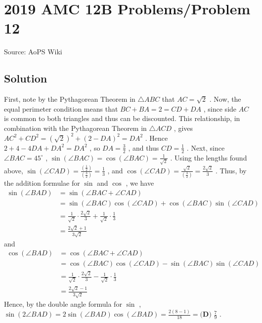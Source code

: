 \documentclass[12pt]{article}
\begin{document}
\section*{{2019 AMC 12B Problems/Problem 12}}
Source: AoPS Wiki

\subsection*{Solution}
First, note by the Pythagorean Theorem in $\triangle ABC$ that $AC = \sqrt{2}$ . Now, the equal perimeter condition means that $BC + BA = 2 = CD + DA$ , since side $AC$ is common to both triangles and thus can be discounted. This relationship, in combination with the Pythagorean Theorem in $\triangle ACD$ , gives $AC^2+CD^2=\left(\sqrt{2}\right)^2+\left(2-DA\right)^2=DA^2$ . Hence $2 + 4 - 4DA + DA^2 = DA^2$ , so $DA = \frac{3}{2}$ , and thus $CD = \frac{1}{2}$ . Next, since $\angle BAC = 45^{\circ}$ , $\sin{\left(\angle BAC\right)} = \cos{\left(\angle BAC\right)} = \frac{1}{\sqrt{2}}$ . Using the lengths found above, $\sin{\left(\angle CAD\right)} = \frac{\left(\frac{1}{2}\right)}{\left(\frac{3}{2}\right)} = \frac{1}{3}$ , and $\cos{\left(\angle CAD\right)} = \frac{\sqrt{2}}{\left(\frac{3}{2}\right)} = \frac{2 \sqrt{2}}{3}$ . Thus, by the addition formulae for $\sin$ and $\cos$ , we have \[\begin{split}\sin{\left(\angle BAD\right)}&=\sin{\left(\angle BAC + \angle CAD\right)}\\&=\sin{\left(\angle BAC\right)}\cos{\left(\angle CAD\right)}+\cos{\left(\angle BAC\right)}\sin{\left(\angle CAD\right)}\\&=\frac{1}{\sqrt{2}}\cdot\frac{2 \sqrt{2}}{3} + \frac{1}{\sqrt{2}}\cdot\frac{1}{3} \\ &= \frac{2 \sqrt{2} + 1}{3 \sqrt{2}}\end{split}\] and \[\begin{split}\cos{\left(\angle BAD\right)}&=\cos{\left(\angle BAC + \angle CAD\right)}\\&=\cos{\left(\angle BAC\right)}\cos{\left(\angle CAD\right)}-\sin{\left(\angle BAC\right)}\sin{\left(\angle CAD\right)}\\&=\frac{1}{\sqrt{2}}\cdot\frac{2 \sqrt{2}}{3} - \frac{1}{\sqrt{2}}\cdot\frac{1}{3} \\ &= \frac{2 \sqrt{2} - 1}{3 \sqrt{2}}\end{split}\] Hence, by the double angle formula for $\sin$ , $\sin{\left(2\angle BAD\right)} = 2\sin{\left(\angle BAD\right)}\cos{\left(\angle BAD\right)} = \frac{2(8-1)}{18} = \boxed{\textbf{(D) } \frac{7}{9}}$ .
\end{document}
